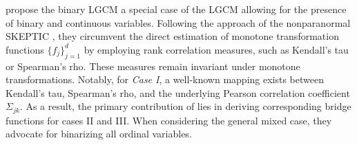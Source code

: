 

\citet{Fan17} propose the binary LGCM a special case of the LGCM allowing for the presence of binary and continuous variables. Following the approach of the nonparanormal SKEPTIC \citep{Liu12}, they circumvent the direct estimation of monotone transformation functions $\{f_j\}_{j=1}^d$ by employing rank correlation measures, such as Kendall's tau or Spearman's rho. These measures remain invariant under monotone transformations. Notably, for \textit{Case I}, a well-known mapping exists between Kendall's tau, Spearman's rho, and the underlying Pearson correlation coefficient $\Sigma_{jk}$. As a result, the primary contribution of \citet{Fan17} lies in deriving corresponding bridge functions for cases II and III. When considering the general mixed case, they advocate for binarizing all ordinal variables.


